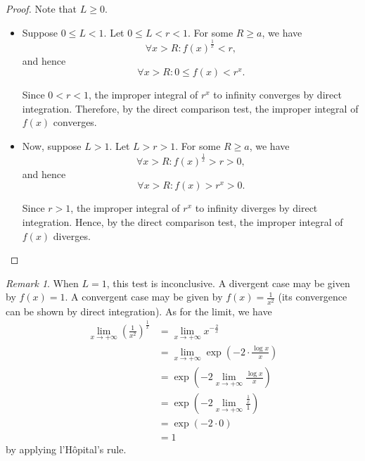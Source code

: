 \documentclass[11pt]{article}
\numberwithin{equation}{section}
\theoremstyle{definition}
\theoremstyle{remark}
\newtheorem{remark}[theorem]{Remark}
\newcommand{\pqty}[1]{\left(#1\right)}
\newcommand{\flatfrac}[2]{\frac{#1}{#2}}
\newcommand{\plusinfty}{+\infty}
\begin{document}
\begin{proof}
    Note that \(L \geq 0\).

    \begin{itemize}
        \item Suppose \(0 \leq L < 1\). Let \(0 \leq L < r < 1\). For some \(R \geq a\), we have
        \[
            \forall x > R: f\pqty{x}^{\flatfrac{1}{x}} < r,
        \]
        and hence
        \[
            \forall x > R: 0 \leq f\pqty{x} < r^x.
        \]

        Since \(0 < r < 1\), the improper integral of \(r^x\) to infinity converges by direct integration. Therefore, by the direct comparison test, the improper integral of \(f\pqty{x}\) converges.

        \item Now, suppose \(L > 1\). Let \(L > r > 1\). For some \(R \geq a\), we have
        \[
            \forall x > R: f\pqty{x}^{\flatfrac{1}{x}} > r > 0,
        \]
        and hence
        \[
            \forall x > R: f\pqty{x} > r^x > 0.
        \]

        Since \(r > 1\), the improper integral of \(r^x\) to infinity diverges by direct integration. Hence, by the direct comparison test, the improper integral of \(f\pqty{x}\) diverges.
    \end{itemize}
\end{proof}

\begin{remark}\label{analysis-unit-0190}
    When \(L = 1\), this test is inconclusive. A divergent case may be given by \(f\pqty{x} = 1\). A convergent case may be given by \(f\pqty{x} = \frac{1}{x^2}\) (its convergence can be shown by direct integration). As for the limit, we have
    \begin{align*}
        \lim_{x \to \plusinfty} \pqty{\frac{1}{x^2}}^{\flatfrac{1}{x}} &= \lim_{x \to \plusinfty} x^{- \flatfrac{2}{x}} \\
        &= \lim_{x \to \plusinfty} \exp\pqty{- 2 \cdot \frac{\log x}{x}} \\
        &= \exp\pqty{-2 \lim_{x \to \plusinfty} \frac{\log x}{x}} \\
        &= \exp\pqty{-2 \lim_{x \to \plusinfty} \frac{\flatfrac{1}{x}}{1}} \\
        &= \exp\pqty{-2 \cdot 0} \\
        &= 1
    \end{align*}
    by applying l'H\^{o}pital's rule.
\end{remark}
\end{document}

